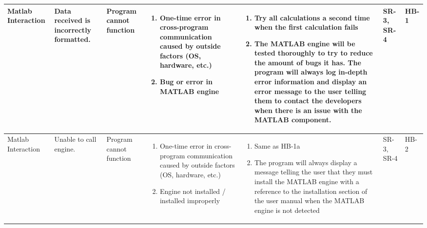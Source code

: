 \documentclass{article}
\begin{document}
\begin{landscape}
\begin{longtable}{|p{} | p{} | p{} | p{} | p{} | p{} | p{}|}
  Matlab Interaction & Data received is incorrectly formatted. & Program cannot function & 
  \begin{enumerate}[leftmargin=*, label={\alph*.}, itemsep=1pt, topsep=0pt, partopsep=0pt] 
    \item One-time error in cross-program communication caused by outside factors (OS, hardware, etc.)
    \item Bug or error in MATLAB engine
  \end{enumerate} &
  \begin{enumerate}[leftmargin=*, label={\alph*.}, itemsep=1pt, topsep=0pt, partopsep=0pt] 
    \item Try all calculations a second time when the first calculation fails
    \item The MATLAB engine will be tested thoroughly to try to reduce the amount of bugs it has. 
    The program will always log in-depth error information and display an error message to the user telling them to contact the developers when there is an issue with the MATLAB component. 
  \end{enumerate} &
  SR-3, SR-4 & HB-1 \\

  \hline

  Matlab Interaction & Unable to call engine. & Program cannot function &
  \begin{enumerate}[leftmargin=*, label={\alph*.}, itemsep=1pt, topsep=0pt, partopsep=0pt] 
    \item One-time error in cross-program communication caused by outside factors (OS, hardware, etc.)
    \item Engine not installed / installed improperly 
  \end{enumerate} &
  \begin{enumerate}[leftmargin=*, label={\alph*.}, itemsep=1pt, topsep=0pt, partopsep=0pt] 
    \item Same as HB-1a
    \item The program will always display a message telling the user that they must install the MATLAB engine with a reference 
    to the installation section of the user manual when the MATLAB engine is not detected 
  \end{enumerate} &
  SR-3, SR-4 & HB-2 \\

  \hline


\end{longtable}
\end{landscape}
\end{document}
